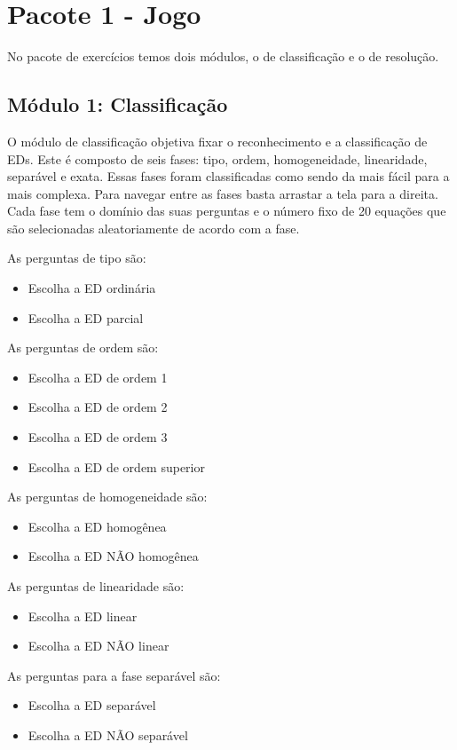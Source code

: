 
\section[Pacote 1 - Jogo]{Pacote 1 - Jogo}
No pacote de exercícios temos dois módulos, o de classificação e o de resolução.

\subsection[Módulo 1: Classificação]{Módulo 1: Classificação}
O módulo de classificação objetiva fixar o reconhecimento e a classificação de EDs. Este é composto de seis fases: tipo, ordem, homogeneidade, linearidade, separável e exata. Essas fases foram classificadas como sendo da mais fácil para a mais complexa. Para navegar entre as fases basta arrastar a tela para a direita.
Cada fase tem o domínio das suas perguntas e o número fixo de 20 equações que são selecionadas aleatoriamente de acordo com a fase.

As perguntas de tipo são: 
\begin{itemize}
	\item{}Escolha a ED ordinária
	\item{}Escolha a ED parcial
\end{itemize}


As perguntas de ordem são:
\begin{itemize}
	\item{}Escolha a ED de ordem 1
	\item{}Escolha a ED de ordem 2
	\item{}Escolha a ED de ordem 3
	\item{}Escolha a ED de ordem superior
\end{itemize}
 	

As perguntas de homogeneidade são:
\begin{itemize}
	\item{}Escolha a ED homogênea
	\item{}Escolha a ED NÃO homogênea
\end{itemize}
					
 
As perguntas de linearidade são:
\begin{itemize}
	\item{}Escolha a ED linear
	\item{}Escolha a ED NÃO linear
\end{itemize} 

As perguntas para a fase separável são:
\begin{itemize}
	\item{}Escolha a ED separável
	\item{}Escolha a ED NÃO separável
\end{itemize}

